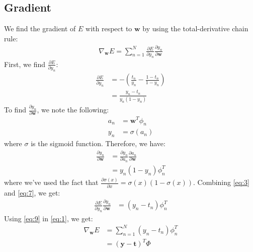 \documentclass[a4paper, 11pt]{article}
\begin{document}
\subsection{Gradient}
We find the gradient of $E$ with respect to $\textbf{w}$ by using the total-derivative chain rule:
\begin{align}
\nabla_{\textbf{w}} E = \sum_{n=1}^N \frac{\partial E}{\partial y_n} \frac{\partial y_n}{\partial \textbf{w}} \label{eq:1}
\end{align}
First, we find $\frac{\partial E}{\partial y_n}$:
\begin{align}
    \frac{\partial E}{\partial y_n} &= -\left(\frac{t_n}{y_n} - \frac{1-t_n}{1-y_n}\right) \\
    &= \frac{y_n - t_n}{y_n(1-y_n)} \label{eq:3}
\end{align}
To find $\frac{\partial y_n}{\partial \textbf{w}}$, we note the following:
\begin{align}
    a_n &= \textbf{w}^T \phi_n \\
    y_n &= \sigma(a_n) 
\end{align}
where $\sigma$ is the sigmoid function. Therefore, we have:
\begin{align}
    \frac{\partial y_n}{\partial \textbf{w}} &= \frac{\partial y_n}{\partial a_n} \frac{\partial a_n}{\partial \textbf{w}} \\
    &= y_n(1-y_n) \phi_n^T \label{eq:7}
\end{align}
where we've used the fact that $\frac{\partial \sigma(x)}{\partial x} = \sigma(x)(1-\sigma(x))$. Combining \eqref{eq:3} and \eqref{eq:7}, we get:
\begin{align}
    \frac{\partial E}{\partial y_n} \frac{\partial y_n}{\partial \textbf{w}} &= (y_n - t_n) \phi_n^T \label{eq:9}
\end{align}
Using \eqref{eq:9} in \eqref{eq:1}, we get:
\begin{align}
    \nabla_{\textbf{w}} E &= \sum_{n=1}^N (y_n - t_n) \phi_n^T \\
    &= (\textbf{y} - \textbf{t})^T \Phi\label{eq:11}
\end{align}
\end{document}
